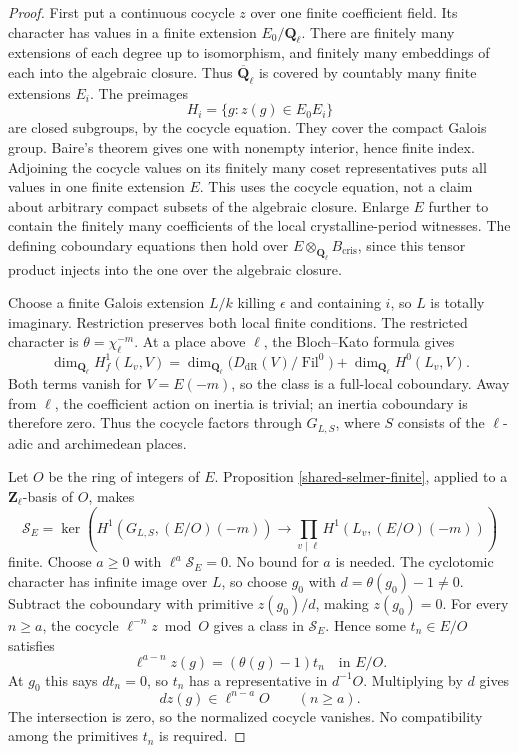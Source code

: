\begin{proof}
First put a continuous cocycle \(z\) over one finite coefficient field.
Its character has values in a finite extension \(E_0/\mathbf Q_\ell\).
There are finitely many extensions of each degree up to isomorphism,
and finitely many embeddings of each into the algebraic closure.
Thus \(\overline{\mathbf Q}_\ell\) is covered by countably many
finite extensions \(E_i\).\cite[Proposition 7.64 and Remark 7.65]{milne-ant}
The preimages
\[
                 H_i=\{g:z(g)\in E_0E_i\}
\]
are closed subgroups, by the cocycle equation. They cover the compact
Galois group. Baire's theorem gives one with nonempty interior, hence
finite index. Adjoining the cocycle values on its finitely many coset
representatives puts all values in one finite extension \(E\).
This uses the cocycle equation, not a claim about arbitrary compact
subsets of the algebraic closure. Enlarge \(E\) further to contain the
finitely many coefficients of the local crystalline-period witnesses.
The defining coboundary equations then hold over
\(E\otimes_{\mathbf Q_\ell}B_{\mathrm{cris}}\), since this tensor
product injects into the one over the algebraic closure.

Choose a finite Galois extension \(L/k\) killing \(\epsilon\) and
containing \(i\), so \(L\) is totally imaginary. Restriction preserves
both local finite conditions. The restricted character is
\(\theta=\chi_\ell^{-m}\). At a place above \(\ell\), the
Bloch--Kato formula gives
\[
 \dim_{\mathbf Q_\ell} H_f^1(L_v,V)
 =\dim_{\mathbf Q_\ell}\bigl(D_{\mathrm{dR}}(V)/
                                      \operatorname{Fil}^0\bigr)
       +\dim_{\mathbf Q_\ell}H^0(L_v,V).
\]
Both terms vanish for \(V=E(-m)\), so the class is a full-local
coboundary.\cite[Corollary 3.8.4 and Example 3.9]{bloch-kato-tamagawa}
Away from \(\ell\), the coefficient action on inertia is trivial;
an inertia coboundary is therefore zero. Thus the cocycle factors
through \(G_{L,S}\), where \(S\) consists of the \(\ell\)-adic and
archimedean places.

Let \(O\) be the ring of integers of \(E\). Proposition
\ref{shared-selmer-finite}, applied to a \(\mathbf Z_\ell\)-basis
of \(O\), makes
\[
 \mathcal S_E=\ker\left(
 H^1(G_{L,S},(E/O)(-m))
 \longrightarrow\prod_{v\mid\ell}H^1(L_v,(E/O)(-m))\right)
\]
finite. Choose \(a\ge0\) with \(\ell^a\mathcal S_E=0\).
No bound for \(a\) is needed. The cyclotomic character has infinite
image over \(L\), so choose \(g_0\) with
\(d=\theta(g_0)-1\ne0\). Subtract the coboundary with primitive
\(z(g_0)/d\), making \(z(g_0)=0\).
For every \(n\ge a\), the cocycle \(\ell^{-n}z\bmod O\) gives
a class in \(\mathcal S_E\). Hence some \(t_n\in E/O\) satisfies
\[
 \ell^{a-n}z(g)=(\theta(g)-1)t_n\quad\text{in }E/O.
\]
At \(g_0\) this says \(dt_n=0\), so \(t_n\) has a representative
in \(d^{-1}O\). Multiplying by \(d\) gives
\[
                      dz(g)\in\ell^{n-a}O
                              \qquad(n\ge a).
\]
The intersection is zero, so the normalized cocycle vanishes.
No compatibility among the primitives \(t_n\) is required.


\end{proof}
